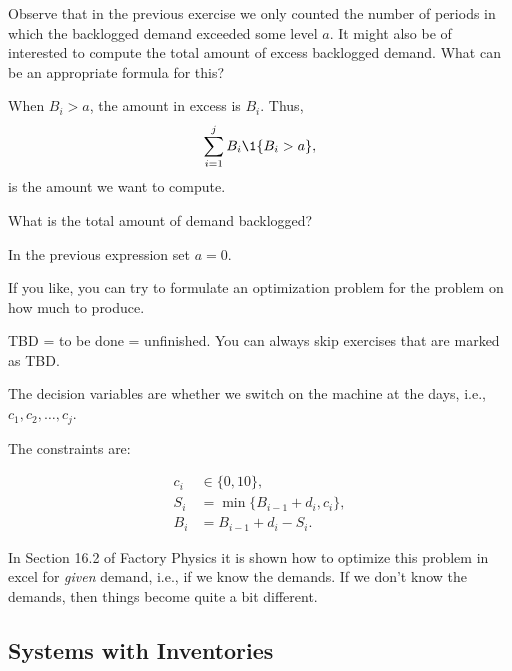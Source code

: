 \begin{question}
  Observe that in the previous exercise we only counted the number of
  periods in which the backlogged demand exceeded some level $a$. It
  might also be of interested to compute the total amount of
excess  backlogged demand. What can be an appropriate formula for this? 
\begin{solution}
    When $B_i>a$, the amount in excess is $B_i$. Thus, 
    \begin{equation*}
      \sum_{i=1}^j B_i \1{B_i > a},
    \end{equation*}
  is the amount we want to compute. 
\end{solution}
\end{question}

\begin{question}
  What is the total amount of demand backlogged? 
  \begin{solution}
    In the previous expression set $a=0$. 
  \end{solution}
\end{question}

\begin{question}[use=false]
  If you like, you can try to formulate an optimization problem for
  the problem on how much to produce. 
  \begin{solution}

    TBD = to be done = unfinished. You can always skip exercises that
    are marked as TBD.

The decision variables are whether we switch on the machine at the days, i.e., $c_1, c_2, \ldots, c_j$. 

The constraints are:

\begin{align*}
c_i &\in \{0, 10\}, \\
      S_i &= \min\{B_{i-1}+d_i, c_i\}, \\
  B_i &= B_{i-1}+d_i - S_i.
\end{align*}

In Section 16.2 of Factory Physics it is shown how to optimize this
problem in excel for \emph{given} demand, i.e., if we know the
demands.  If we don't know the demands, then things become quite a bit
different.

  \end{solution}
\end{question}



\subsection{Systems with Inventories}
\label{sec:inventories}

